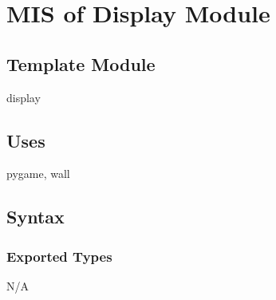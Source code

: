 \documentclass[12pt, titlepage]{article}
\begin{document}
\section{MIS of Display Module}
        \subsection{Template Module}
        display
        \subsection{Uses}
        pygame, wall
		\subsection{Syntax}
		\subsubsection{Exported Types}
		N/A
\end{document}
